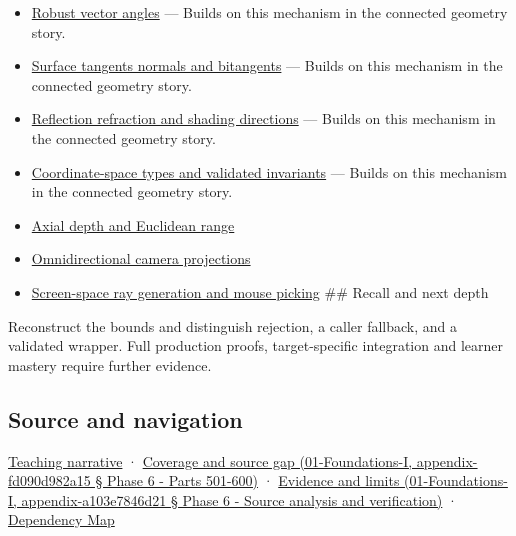 \begin{itemize}
\item
  \hyperref[appendix-e569e60e18e6]{Robust vector angles} --- Builds on this mechanism in the connected geometry story.
\item
  \hyperref[appendix-e31893dec985]{Surface tangents normals and bitangents} --- Builds on this mechanism in the connected geometry story.
\item
  \hyperref[appendix-44e00863b4d5]{Reflection refraction and shading directions} --- Builds on this mechanism in the connected geometry story.
\item
  \hyperref[appendix-380a220e2529]{Coordinate-space types and validated invariants} --- Builds on this mechanism in the connected geometry story.
\item
  \hyperref[appendix-cac01ebeeb11]{Axial depth and Euclidean range}
\item
  \hyperref[appendix-fc99ad39f351]{Omnidirectional camera projections}
\item
  \hyperref[appendix-f1a6d43e80d1]{Screen-space ray generation and mouse picking} \#\# Recall and next depth
\end{itemize}

Reconstruct the bounds and distinguish rejection, a caller fallback, and a validated wrapper. Full production proofs, target-specific integration and learner mastery require further evidence.

\subsection{Source and navigation}\label{source-and-navigation}

\href{Continuous\%20Notes/Computing\%20Foundations\%20-\%20From\%20Bits\%20to\%20C++\%20and\%20Systems\%20APIs\#A\%20direction\%20can\%20exist\%20even\%20when\%20the\%20naive\%20length\%20overflows}{Teaching narrative} · \href{}{Coverage and source gap (01-Foundations-I, appendix-fd090d982a15 § Phase 6 - Parts 501-600)} · \href{}{Evidence and limits (01-Foundations-I, appendix-a103e7846d21 § Phase 6 - Source analysis and verification)} · \hyperref[appendix-4ad47bdd269a]{Dependency Map}
